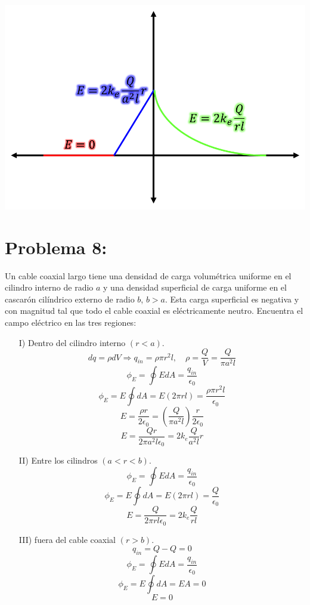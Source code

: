 \documentclass[12pt]{article}
\begin{document}
			\begin{center}
				\includegraphics[width=.9\linewidth]{Fig 1.png}
			\end{center}

		\section{Problema 8:}\label{sec:Problema8}
			Un cable coaxial largo tiene una densidad de carga volumétrica uniforme en el cilindro 
			interno de radio $ a $ y una densidad superficial de carga uniforme en el cascarón
			cilíndrico externo de radio $ b $, $ b > a $. Esta carga superficial es negativa y con 
			magnitud tal que todo el cable coaxial es eléctricamente neutro. Encuentra el campo
			eléctrico en las tres regiones: 
			\begin{enumerate}
				\item[I)]	 Dentro del cilindro interno $ (r < a) $.
						 $$ dq = \rho dV \Longrightarrow q_{in} = \rho \pi r^2 l, \quad \rho = \frac{Q}{V} = \frac{Q}{\pi a^2 l} $$
						 $$ \phi_E = \oint EdA = \frac{q_{in}}{\epsilon_0} $$
						 $$ \phi_E = E \oint dA = E(2 \pi r l) = \frac{\rho \pi r^2 l}{\epsilon_0} $$ 
						 $$ E = \frac{\rho r}{2 \epsilon_0} = \left( \frac{Q}{\pi a^2 l} \right) \frac{r}{2 \epsilon_0} $$
						 $$ E = \frac{Qr}{2 \pi a^2 l \epsilon_0} = 2 k_e \frac{Q}{a^2 l} r $$
				\item[II)] Entre los cilindros $ (a < r < b) $.
						 $$ \phi_E = \oint EdA = \frac{q_{in}}{\epsilon_0} $$
						 $$ \phi_E = E \oint dA = E(2 \pi r l) = \frac{Q}{\epsilon_0} $$
						 $$ E = \frac{Q}{2 \pi r l \epsilon_0} = 2k_e \frac{Q}{rl} $$
				\item[III)]fuera del cable coaxial $ (r > b) $.
						  $$ q_{in} = Q - Q = 0 $$
						  $$ \phi_E = \oint EdA = \frac{q_{in}}{\epsilon_0} $$
						  $$ \phi_E = E \oint dA = EA = 0 $$
						  $$ E = 0 $$
			\end{enumerate}

	
\end{document}
